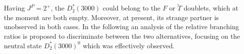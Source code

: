 Having $J^P = 2^+$, the $D^*_2(3000)$ could belong to the $F$ or $\tilde{T}$ doublets, which at the moment are both empty. Moreover, at present, its strange partner is unobserved in both cases. In the following an analysis of the relative branching ratios is proposed to discriminate between the two alternatives, focusing on the neutral state $D^*_2(3000)^0$ which was effectively observed.


